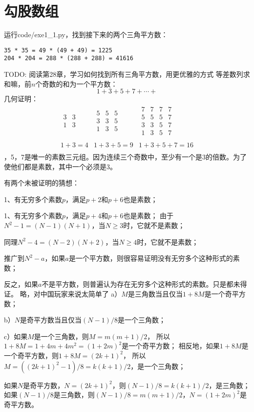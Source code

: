 \chapter{勾股数组}
\exercise
运行code/exe1\_1.py，找到接下来的两个三角平方数：
\begin{verbatim}
35 * 35 = 49 * (49 + 49) = 1225
204 * 204 = 288 * (288 + 288) = 41616
\end{verbatim}
TODO: 阅读第28章，学习如何找到所有三角平方数，用更优雅的方式
%
\exercise
等差数列求和嘛，前$n$个奇数的和为一个平方数：
\[1+3+5+7+\cdots+\]
几何证明：
\[
    \begin{array}{ccc}
        \begin{array}{cc}
            3 & 3 \\
            1 & 3 \\
        \end{array} &
        \begin{array}{ccc}
            5 & 5 & 5 \\
            3 & 3 & 5 \\
            1 & 3 & 5 \\
        \end{array} &
        \begin{array}{cccc}
            7 & 7 & 7 & 7 \\
            5 & 5 & 5 & 7 \\
            3 & 3 & 5 & 7 \\
            1 & 3 & 5 & 7 \\
        \end{array} \\

        1 + 3 = 4 &
        1 + 3 + 5 = 9 &
        1 + 3 + 5 + 7 = 16 \\
    \end{array}
\]
%
，5，7是唯一的素数三元组。因为连续三个奇数中，至少有一个是3的倍数。为了使他们都是素数，其中一个必须是3。\par
有两个未被证明的猜想：\par
1、有无穷多个素数$p$，满足$p+2$和$p+6$也是素数；\par
1、有无穷多个素数$p$，满足$p+4$和$p+6$也是素数；
%
\exercise
由于$N^2-1=(N-1)(N+1)$，当$N\ge3$时，它就不是素数；\par
同理$N^2-4=(N-2)(N+2)$，当$N\ge4$时，它就不是素数；\par
推广到$N^2-a$，如果$a$是一个平方数，则很容易证明没有无穷多个这种形式的素数；\par
反之，如果$a$不是平方数，则普遍认为存在无穷多个这种形式的素数。只是都未得证。
%
\exercise 
略，对中国玩家来说太简单了
%
\exercise
a）$M$是三角数当且仅当\underline{$1+8M$}是一个奇平方数；\par
b）$N$是奇平方数当且仅当\underline{$(N-1)/8$}是一个三角数；\par
c）\proof 如果$M$是一个三角数，则$M=m(m+1)/2$，
所以$1+8M=1+4m+4m^2=(1+2m)^2$是一个奇平方数；
相反地，如果$1+8M$是一个奇平方数，则$1+8M=(2k+1)^2$，
所以$M=((2k+1)^2-1)/8=k(k+1)/2$，是一个三角数；\par
如果$N$是奇平方数，$N=(2k+1)^2$，则$(N-1)/8=k(k+1)/2$，是三角数；
如果$(N-1)/8$是三角数，则$(N-1)/8=m(m+1)/2$，$N=(1+2m)^2$是奇平方数。